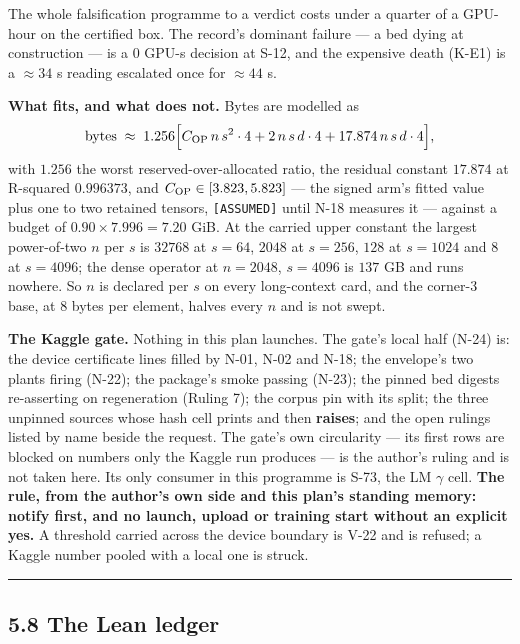 \documentclass[11pt,a4paper]{article}
\theoremstyle{plain}
\theoremstyle{definition}
\theoremstyle{remark}
\begin{document}
The whole falsification programme to a verdict costs under a quarter of
a GPU-hour on the certified box. The record's dominant failure --- a bed
dying at construction --- is a \(0\) GPU-s decision at S-12, and the
expensive death (K-E1) is a \(\approx34\) s reading escalated once for
\(\approx44\) s.

\textbf{What fits, and what does not.} Bytes are modelled as
\[\text{bytes}\;\approx\;1.256\Big[C_{\rm OP}\,n\,s^2\cdot4+2\,n\,s\,d\cdot4+17.874\,n\,s\,d\cdot4\Big],\]
with \(1.256\) the worst reserved-over-allocated ratio, the residual
constant \(17.874\) at R-squared \(0.996373\), and
\(C_{\rm OP}\in[3.823,5.823]\) --- the signed arm's fitted value plus
one to two retained tensors, \texttt{{[}ASSUMED{]}} until N-18 measures
it --- against a budget of \(0.90\times7.996=7.20\) GiB. At the carried
upper constant the largest power-of-two \(n\) per \(s\) is \(32768\) at
\(s=64\), \(2048\) at \(s=256\), \(128\) at \(s=1024\) and \(8\) at
\(s=4096\); the dense operator at \(n=2048\), \(s=4096\) is \(137\) GB
and runs nowhere. So \(n\) is declared per \(s\) on every long-context
card, and the corner-3 base, at 8 bytes per element, halves every \(n\)
and is not swept.

\textbf{The Kaggle gate.} Nothing in this plan launches. The gate's
local half (N-24) is: the device certificate lines filled by N-01, N-02
and N-18; the envelope's two plants firing (N-22); the package's smoke
passing (N-23); the pinned bed digests re-asserting on regeneration
(Ruling 7); the corpus pin with its split; the three unpinned sources
whose hash cell prints and then \textbf{raises}; and the open rulings
listed by name beside the request. The gate's own circularity --- its
first rows are blocked on numbers only the Kaggle run produces --- is
the author's ruling and is not taken here. Its only consumer in this
programme is S-73, the LM \(\gamma\) cell. \textbf{The rule, from the
author's own side and this plan's standing memory: notify first, and no
launch, upload or training start without an explicit yes.} A threshold
carried across the device boundary is V-22 and is refused; a Kaggle
number pooled with a local one is struck.

\begin{center}\rule{0.5\linewidth}{0.5pt}\end{center}

\subsection{5.8 The Lean ledger}\label{the-lean-ledger}
\end{document}
